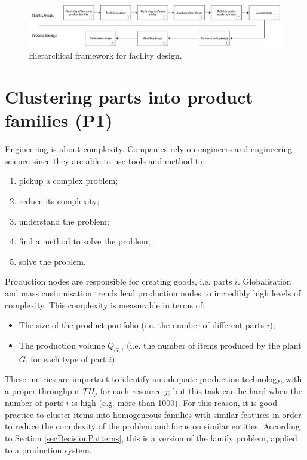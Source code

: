 \begin{figure}[hbt!]
\centering
\includegraphics[width=1\textwidth]{sectionProduction/design_plant_figures/fig_prod_plant_design.png}
\captionsetup{type=figure}
\caption{Hierarchical framework for facility design.}
\label{fig_prod_plant_design}
\end{figure}



\section{Clustering parts into product families (P1)} \label{secClusteringParts}
Engineering is about complexity. Companies rely on engineers and engineering science since they are able to use tools and method to:

\begin{enumerate}
    \item pickup a complex problem;
    \item reduce its complexity;
    \item understand the problem;
    \item find a method to solve the problem;
    \item solve the problem.

\end{enumerate}

Production nodes are responsible for creating goods, i.e. parts $i$. Globalisation and mass customisation trends lead production nodes to incredibly high levels of complexity. This complexity is measurable in terms of:

\begin{itemize}
    \item The size of the product portfolio (i.e. the number of different parts $i$);
	\item The production volume $Q_{G,i}$ (i.e. the number of items produced by the plant $G$, for each type of part $i$).

\end{itemize}

These metrics are important to identify an adequate production technology, with a proper throughput $TH_j$ for each resource $j$; but this task can be hard when the number of parts $i$ is high (e.g. more than 1000). For this reason, it is good practice to cluster items into homogeneous families with similar features in order to reduce the complexity of the problem and focus on similar entities. According to Section \ref{secDecisionPatterns}, this is a version of the family problem, applied to a production system.

